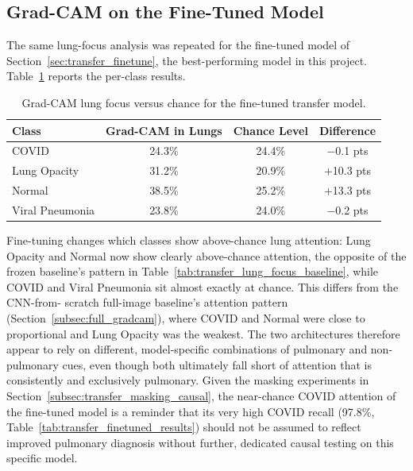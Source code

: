 \subsection{Grad-CAM on the Fine-Tuned Model}
\label{subsec:transfer_gradcam_finetuned}

The same lung-focus analysis was repeated for the fine-tuned model of
Section~\ref{sec:transfer_finetune}, the best-performing model in this
project. Table~\ref{tab:transfer_lung_focus_finetuned} reports the
per-class results.

\begin{table}[H]
\centering
\caption{Grad-CAM lung focus versus chance for the fine-tuned transfer model.}
\label{tab:transfer_lung_focus_finetuned}
\begin{tabular}{lccc}
\toprule
\textbf{Class} & \textbf{Grad-CAM in Lungs} & \textbf{Chance Level} & \textbf{Difference} \\
\midrule
COVID            & 24.3\% & 24.4\% & $-$0.1 pts \\
Lung Opacity     & 31.2\% & 20.9\% & $+$10.3 pts \\
Normal           & 38.5\% & 25.2\% & $+$13.3 pts \\
Viral Pneumonia  & 23.8\% & 24.0\% & $-$0.2 pts \\
\bottomrule
\end{tabular}
\end{table}

Fine-tuning changes which classes show above-chance lung attention: Lung
Opacity and Normal now show clearly above-chance attention, the opposite of
the frozen baseline's pattern in
Table~\ref{tab:transfer_lung_focus_baseline}, while COVID and Viral
Pneumonia sit almost exactly at chance. This differs from the CNN-from-
scratch full-image baseline's attention pattern
(Section~\ref{subsec:full_gradcam}), where COVID and Normal were close to
proportional and Lung Opacity was the weakest. The two architectures
therefore appear to rely on different, model-specific combinations of
pulmonary and non-pulmonary cues, even though both ultimately fall short of
attention that is consistently and exclusively pulmonary. Given the masking
experiments in Section~\ref{subsec:transfer_masking_causal}, the near-chance
COVID attention of the fine-tuned model is a reminder that its very high
COVID recall (97.8\%, Table~\ref{tab:transfer_finetuned_results}) should not
be assumed to reflect improved pulmonary diagnosis without further,
dedicated causal testing on this specific model.

